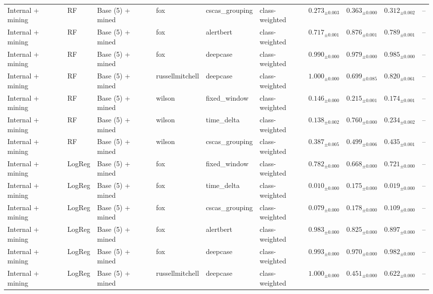 \begin{longtable}{llllllcccc}
\addlinespace
Internal + mining & RF & Base (5) + mined & fox & cscas\_grouping & class-weighted & $0.273_{\pm 0.003}$ & $0.363_{\pm 0.000}$ & $0.312_{\pm 0.002}$ & -- \\
\addlinespace
Internal + mining & RF & Base (5) + mined & fox & alertbert & class-weighted & $0.717_{\pm 0.001}$ & $0.876_{\pm 0.001}$ & $0.789_{\pm 0.001}$ & -- \\
\addlinespace
Internal + mining & RF & Base (5) + mined & fox & deepcase & class-weighted & $0.990_{\pm 0.000}$ & $0.979_{\pm 0.000}$ & $0.985_{\pm 0.000}$ & -- \\
\addlinespace
Internal + mining & RF & Base (5) + mined & russellmitchell & deepcase & class-weighted & $1.000_{\pm 0.000}$ & $0.699_{\pm 0.085}$ & $0.820_{\pm 0.061}$ & -- \\
\addlinespace
Internal + mining & RF & Base (5) + mined & wilson & fixed\_window & class-weighted & $0.146_{\pm 0.000}$ & $0.215_{\pm 0.001}$ & $0.174_{\pm 0.001}$ & -- \\
\addlinespace
Internal + mining & RF & Base (5) + mined & wilson & time\_delta & class-weighted & $0.138_{\pm 0.002}$ & $0.760_{\pm 0.000}$ & $0.234_{\pm 0.002}$ & -- \\
\addlinespace
Internal + mining & RF & Base (5) + mined & wilson & cscas\_grouping & class-weighted & $0.387_{\pm 0.005}$ & $0.499_{\pm 0.006}$ & $0.435_{\pm 0.001}$ & -- \\
\addlinespace
Internal + mining & LogReg & Base (5) + mined & fox & fixed\_window & class-weighted & $0.782_{\pm 0.000}$ & $0.668_{\pm 0.000}$ & $0.721_{\pm 0.000}$ & -- \\
\addlinespace
Internal + mining & LogReg & Base (5) + mined & fox & time\_delta & class-weighted & $0.010_{\pm 0.000}$ & $0.175_{\pm 0.000}$ & $0.019_{\pm 0.000}$ & -- \\
\addlinespace
Internal + mining & LogReg & Base (5) + mined & fox & cscas\_grouping & class-weighted & $0.079_{\pm 0.000}$ & $0.178_{\pm 0.000}$ & $0.109_{\pm 0.000}$ & -- \\
\addlinespace
Internal + mining & LogReg & Base (5) + mined & fox & alertbert & class-weighted & $0.983_{\pm 0.000}$ & $0.825_{\pm 0.000}$ & $0.897_{\pm 0.000}$ & -- \\
\addlinespace
Internal + mining & LogReg & Base (5) + mined & fox & deepcase & class-weighted & $0.993_{\pm 0.000}$ & $0.970_{\pm 0.000}$ & $0.982_{\pm 0.000}$ & -- \\
\addlinespace
Internal + mining & LogReg & Base (5) + mined & russellmitchell & deepcase & class-weighted & $1.000_{\pm 0.000}$ & $0.451_{\pm 0.000}$ & $0.622_{\pm 0.000}$ & -- \\

\end{longtable}
